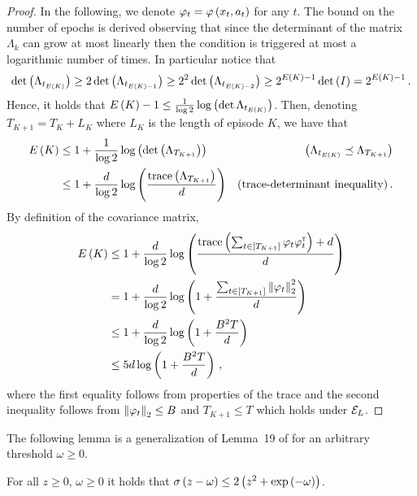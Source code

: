 \begin{proof}
    In the following, we denote $\varphi_t = \varphi \left( x_t, a_t \right)$ for any $t$. The bound on the number of epochs is derived observing that since the determinant of the matrix $\Lambda_k$ can grow at most linearly then the condition is triggered at most a logarithmic number of times. In particular notice that
    \begin{equation*}
        \det \left( \Lambda_{t_{E \left( K \right)}} \right) \geq 2 \det \left( \Lambda_{t_{E \left( K \right) - 1}} \right) \geq 2^2 \det \left( \Lambda_{t_{E \left( K \right) - 2}} \right) \geq 2^{E \left( K \right) - 1} \det \left( I \right) = 2^{E \left( K \right) - 1}\,.
    \end{equation*}
    Hence, it holds that $E \left( K \right) - 1 \leq \frac{1}{\log 2} \log \left( \det \Lambda_{t_{E \left( K \right)}} \right)$. Then, denoting $T_{K+1} = T_K + L_K$ where $L_K$ is the length of episode $K$, we have that
    \begin{align*}
        E \left( K \right) &\leq 1 + \frac{1}{\log 2} \log \left( \det \left( \Lambda_{T_{K+1}} \right) \right) & \left( \Lambda_{t_{E \left( K \right)}} \preceq \Lambda_{T_{K+1}} \right) \\
        &\leq 1 + \frac{d}{\log 2} \log \left({\frac{\operatorname{trace} \left( \Lambda_{T_{K+1}} \right)}{d}}\right) & \text{(trace-determinant inequality)}\,.
    \end{align*}
    By definition of the covariance matrix,
    \begin{align*}
        E \left( K \right) & \leq 1 + \frac{d}{\log 2} \log \left( \frac{\operatorname{trace} \left( \sum_{t \in \left[ T_{K+1} \right]} \varphi_t \varphi_t^\mathsf{\scriptscriptstyle T} \right) + d}{d} \right) \\
        &= 1 + \frac{d}{\log 2} \log \left( 1 + \frac{\sum_{t \in \left[ T_{K+1} \right]} \left\|\varphi_t\right\|_2^2}{d} \right)
        \\
        &\leq 1 + \frac{d}{\log 2} \log \left( 1 + \frac{B^2 T}{d} \right) \\
        &\leq 5 d \log \left( 1 + \frac{B^2 T}{d} \right)\,,
    \end{align*}
    where the first equality follows from properties of the trace and the second inequality follows from $\left\|\varphi_t\right\|_2 \leq B$ and $T_{K+1} \leq T$ which holds under $\mathcal{E}_L$.
\end{proof}

The following lemma is a generalization of Lemma~19 of \citet{cassel2024warmupfree} for an arbitrary threshold $\omega \geq 0$.
%
\begin{lemma} \label{lem:sigmoid-bound}
  For all $z \geq 0$, $\omega \geq 0$ it holds that $\sigma \left( z - \omega \right) \leq 2 \left( z^2 + \exp \left( - \omega \right) \right)$.
\end{lemma}

